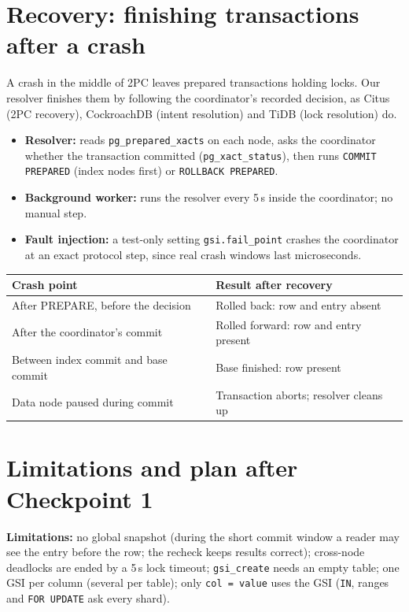 \documentclass[11pt,a4paper]{article}
\begin{document}
\section{Recovery: finishing transactions after a crash}
A crash in the middle of 2PC leaves prepared transactions holding locks. Our resolver finishes them
by following the coordinator's recorded decision, as Citus (2PC recovery), CockroachDB (intent
resolution) and TiDB (lock resolution) do.
\begin{itemize}
  \item \textbf{Resolver:} reads \texttt{pg\_prepared\_xacts} on each node, asks the coordinator
        whether the transaction committed (\texttt{pg\_xact\_status}), then runs
        \texttt{COMMIT PREPARED} (index nodes first) or \texttt{ROLLBACK PREPARED}.
  \item \textbf{Background worker:} runs the resolver every 5\,s inside the coordinator; no manual step.
  \item \textbf{Fault injection:} a test-only setting \texttt{gsi.fail\_point} crashes the coordinator
        at an exact protocol step, since real crash windows last microseconds.
\end{itemize}

\begin{center}
\begin{tabular}{ll}
\toprule
Crash point & Result after recovery \\
\midrule
After PREPARE, before the decision     & Rolled back: row and entry absent \\
After the coordinator's commit         & Rolled forward: row and entry present \\
Between index commit and base commit   & Base finished: row present \\
Data node paused during commit         & Transaction aborts; resolver cleans up \\
\bottomrule
\end{tabular}
\end{center}

\section*{Limitations and plan after Checkpoint 1}
\textbf{Limitations:} no global snapshot (during the short commit window a reader may see the entry
before the row; the recheck keeps results correct); cross-node deadlocks are ended by a 5\,s lock
timeout; \texttt{gsi\_create} needs an empty table; one GSI per column (several per table); only \texttt{col = value}
uses the GSI (\texttt{IN}, ranges and \texttt{FOR UPDATE} ask every shard).
\end{document}
